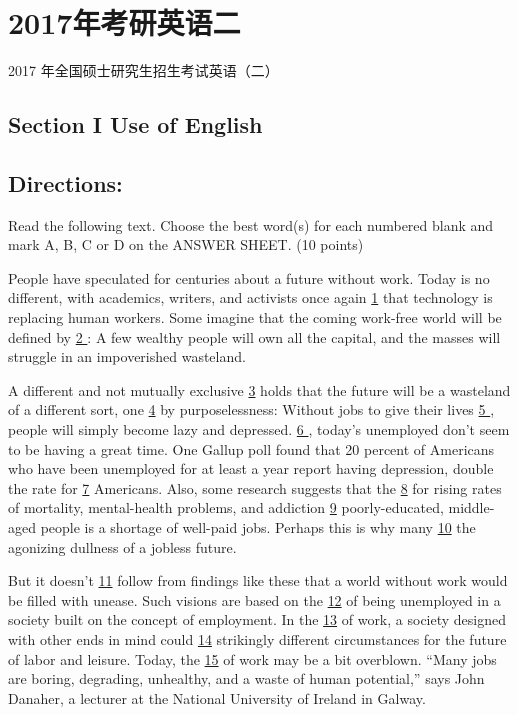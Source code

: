 \documentclass[UTF8,11pt]{ctexart}
\begin{document}
\section*{2017年考研英语二}
2017 年全国硕士研究生招生考试英语（二）


\subsection*{\textbf{Section I Use of English}}


\subsection*{\textbf{Directions:}}


Read the following text. Choose the best word(s) for each numbered blank and mark A, B, C or D on the ANSWER SHEET. (10 points)


People have speculated for centuries about a future without work. Today is no different, with academics, writers, and activists once again \uline{1} that technology is replacing human workers. Some imagine that the coming work-free world will be defined by \uline{2 }: A few wealthy people will own all the capital, and the masses will struggle in an impoverished wasteland.


A different and not mutually exclusive \uline{3} holds that the future will be a wasteland of a different sort, one \uline{4} by purposelessness: Without jobs to give their lives \uline{5 }, people will simply become lazy and depressed. \uline{6 }, today’s unemployed don’t seem to be having a great time. One Gallup poll found that 20 percent of Americans who have been unemployed for at least a year report having depression, double the rate for \uline{7} Americans. Also, some research suggests that the \uline{8} for rising rates of mortality, mental-health problems, and addiction \uline{9} poorly-educated, middle-aged people is a shortage of well-paid jobs. Perhaps this is why many \uline{10} the agonizing dullness of a jobless future.


But it doesn’t \uline{11} follow from findings like these that a world without work would be filled with unease. Such visions are based on the \uline{12} of being unemployed in a society built on the concept of employment. In the \uline{13} of work, a society designed with other ends in mind could \uline{14} strikingly different circumstances for the future of labor and leisure. Today, the \uline{15} of work may be a bit overblown. “Many jobs are boring, degrading, unhealthy, and a waste of human potential,” says John Danaher, a lecturer at the National University of Ireland in Galway.
\end{document}
